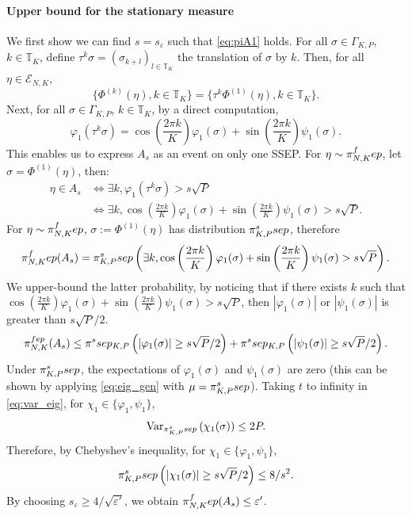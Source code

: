 \documentclass[11pt,a4paper]{article}
\newcommand{\T}{\mathbb{T}}
\newcommand{\FEP}{\textsc{fep}}
\newcommand{\SSEP}{\textsc{ssep}}
\newcommand{\eqs}[1]{\begin{equation}#1\end{equation}}
\begin{document}
\paragraph{Upper bound for the stationary measure} We first show we can find $s = s_\varepsilon$ such that \eqref{eq:piA1} holds. 
For all $\sigma\in\Gamma_{K,P}$, $k \in \T_K$, define $\tau^k \sigma = \left(\sigma_{k+l}\right)_{l\in \T_K}$ the translation of $\sigma$ by $k$.
Then, for all $\eta\in\mathcal{E}_{N,K}$,
\eqs{\{\Phi^{(k)}\left(\eta\right),k\in \T_K\} = \{\tau^k\Phi^{(1)}\left(\eta\right),k\in \T_K\} .}
Next, for all $\sigma\in\Gamma_{K,P}$,  $k\in \T_K$, by a direct computation,
\eqs{\varphi_1(\tau^k \sigma) = \cos\left(\frac{2\pi k}{K}\right) \varphi_1(\sigma) + \sin\left(\frac{2\pi k}{K}\right) \psi_1(\sigma).}
This enables us to express $A_s$ as an event on only one SSEP. For $\eta \sim \pi_{N,K}^\FEP$, let $\sigma = \Phi^{(1)}(\eta)$, then:
\begin{align}
\eta\in A_s &\iff \exists k, \varphi_1(\tau^k \sigma) > s\sqrt{P} \\
&\iff \exists k, \cos\left(\frac{2\pi k}{K}\right) \varphi_1(\sigma) + \sin\left(\frac{2\pi k}{K}\right) \psi_1(\sigma) > s\sqrt{P}.
\end{align}
For $\eta \sim \pi_{N,K}^\FEP$, $\sigma:= \Phi^{(1)}(\eta)$ has distribution $\pi_{K,P}^\SSEP$,  therefore
\eqs{\pi_{N,K}^\FEP(A_s) = \pi_{K,P}^\SSEP\left( \exists k, \cos\left(\frac{2\pi k}{K}\right) \varphi_1(\sigma) + \sin\left(\frac{2\pi k}{K}\right) \psi_1(\sigma) > s\sqrt{P}\right).}We upper-bound the latter probability, by noticing that if
there exists $k$ such that $ \cos\left(\frac{2\pi k}{K}\right) \varphi_1(\sigma) + \sin\left(\frac{2\pi k}{K}\right) \psi_1(\sigma) > s\sqrt{P}$, then $|\varphi_1(\sigma)|$ or $|\psi_1(\sigma)|$ is greater than $ s\sqrt{P}/2$.
\eqs{\pi^{\FEP}_{N,K}(A_s) \le \pi^\SSEP_{K,P}\left(|\varphi_1(\sigma)|\ge s\sqrt{P}/2\right) + \pi^\SSEP_{K,P}\left(|\psi_1(\sigma)|\ge s\sqrt{P}/2\right).} 
Under $\pi_{K,P}^\SSEP$, the expectations of $\varphi_1(\sigma)$ and $\psi_1(\sigma)$ are zero (this can be shown by applying \eqref{eq:eig_gen} with $\mu = \pi_{K,P}^\SSEP$). Taking $t$ to infinity in \eqref{eq:var_eig}, for $\chi_1\in \{\varphi_1,\psi_1\}$, 
\eqs{\mathrm{Var}_{\pi_{K,P}^\SSEP}\left(\chi_1(\sigma)\right) \le 2P.}
Therefore, by Chebyshev's inequality, for $\chi_1\in \{\varphi_1,\psi_1\}$,\eqs{\pi_{K,P}^\SSEP\left(|\chi_1(\sigma)|\ge s\sqrt{P}/2\right)  \le 8/s^2 .}
By choosing  $s_\varepsilon \ge 4/\sqrt{\varepsilon'}$, we obtain $\pi_{N,K}^\FEP(A_s)\le \varepsilon'$.
\end{document}
